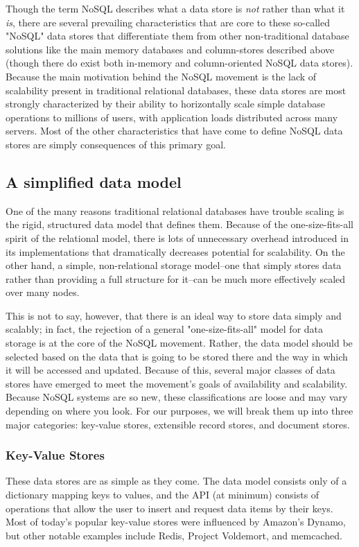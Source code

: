 \documentclass[11pt,a4paper]{report}
\begin{document}
Though the term NoSQL describes what a data store is \textit{not} rather than what it \textit{is}, there are several prevailing characteristics that are core to these so-called "NoSQL" data stores that differentiate them from other non-traditional database solutions like the main memory databases and column-stores described above (though there do exist both in-memory and column-oriented NoSQL data stores). Because the main motivation behind the NoSQL movement is the lack of scalability present in traditional relational databases, these data stores are most strongly characterized by their ability to horizontally scale simple database operations to millions of users, with application loads distributed across many servers.\cite{strauch2011nosql} Most of the other characteristics that have come to define NoSQL data stores are simply consequences of this primary goal.

\subsection{A simplified data model}
One of the many reasons traditional relational databases have trouble scaling is the rigid, structured data model that defines them. Because of the one-size-fits-all spirit of the relational model, there is lots of unnecessary overhead introduced in its implementations that dramatically decreases potential for scalability. On the other hand, a simple, non-relational storage model--one that simply stores data rather than providing a full structure for it--can be much more effectively scaled over many nodes. 

This is not to say, however, that there is an ideal way to store data simply and scalably; in fact, the rejection of a general "one-size-fits-all" model for data storage is at the core of the NoSQL movement. Rather, the data model should be selected based on the data that is going to be stored there and the way in which it will be accessed and updated. Because of this, several major classes of data stores have emerged to meet the movement's goals of availability and scalability. Because NoSQL systems are so new, these classifications are loose and may vary depending on where you look. For our purposes, we will break them up into three major categories: key-value stores, extensible record stores, and document stores.

\subsubsection{Key-Value Stores}
These data stores are as simple as they come. The data model consists only of a dictionary mapping keys to values, and the API (at minimum) consists of operations that allow the user to insert and request data items by their keys.\cite{strauch2011nosql} Most of today's popular key-value stores were influenced by Amazon's Dynamo, but other notable examples include Redis, Project Voldemort, and memcached.
 
\end{document}

